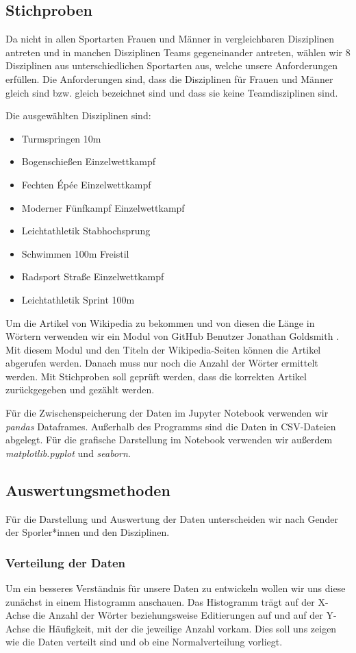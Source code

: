 \documentclass[11pt]{article}
\begin{document}
\subsection{Stichproben}
Da nicht in allen Sportarten Frauen und Männer in vergleichbaren Disziplinen antreten und in manchen Disziplinen Teams gegeneinander antreten, wählen wir 8 Disziplinen aus unterschiedlichen Sportarten aus, welche unsere Anforderungen erfüllen. Die Anforderungen sind, dass die Disziplinen für Frauen und Männer gleich sind bzw. gleich bezeichnet sind und dass sie keine Teamdisziplinen sind.

Die ausgewählten Disziplinen sind:
\begin{itemize}
\item Turmspringen 10m
\item Bogenschießen Einzelwettkampf
\item Fechten Épée Einzelwettkampf
\item Moderner Fünfkampf Einzelwettkampf
\item Leichtathletik Stabhochsprung
\item Schwimmen 100m Freistil
\item Radsport Straße Einzelwettkampf
\item Leichtathletik Sprint 100m
\end{itemize}

Um die Artikel von Wikipedia zu bekommen und von diesen die Länge in Wörtern verwenden wir ein Modul von GitHub Benutzer Jonathan Goldsmith \parencite{GoldsmithWikipedia}. Mit diesem Modul und den Titeln der Wikipedia-Seiten können die Artikel abgerufen werden. Danach muss nur noch die Anzahl der Wörter ermittelt werden. Mit Stichproben soll geprüft werden, dass die korrekten Artikel zurückgegeben und gezählt werden.

Für die Zwischenspeicherung der Daten im Jupyter Notebook verwenden wir \textit{pandas} Dataframes. Außerhalb des Programms sind die Daten in CSV-Dateien abgelegt. Für die grafische Darstellung im Notebook verwenden wir außerdem \textit{matplotlib.pyplot} und \textit{seaborn}.

\subsection{Auswertungsmethoden}
Für die Darstellung und Auswertung der Daten unterscheiden wir nach Gender der Sporler*innen und den Disziplinen.

\subsubsection{Verteilung der Daten}
Um ein besseres Verständnis für unsere Daten zu entwickeln wollen wir uns diese zunächst in einem Histogramm anschauen. Das Histogramm trägt auf der X-Achse die Anzahl der Wörter beziehungsweise Editierungen auf und auf der Y-Achse die Häufigkeit, mit der die jeweilige Anzahl vorkam. Dies soll uns zeigen wie die Daten verteilt sind und ob eine Normalverteilung vorliegt.
\end{document}
